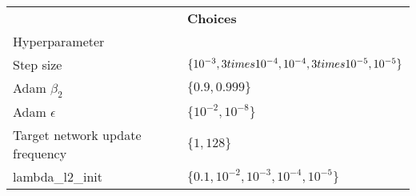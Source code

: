 \begin{tabular}{ll}
 & \bfseries Choices \\
Hyperparameter &  \\
Step size & $\{10^{-3}, 3 \\times 10^{-4}, 10^{-4}, 3 \\times 10^{-5}, 10^{-5}\}$ \\
Adam $\beta_2$ & $\{0.9, 0.999\}$ \\
Adam $\epsilon$ & $\{10^{-2}, 10^{-8}\}$ \\
Target network update frequency & $\{1, 128\}$ \\
lambda_l2_init & $\{0.1, 10^{-2}, 10^{-3}, 10^{-4}, 10^{-5}\}$ \\
\end{tabular}
